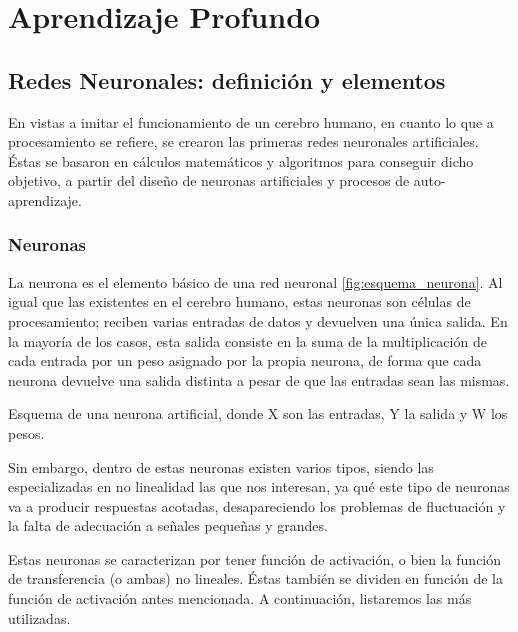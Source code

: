 \chapter{Aprendizaje Profundo}
\label{cap:deepLearning}


\section{Redes Neuronales: definición y elementos}
En vistas a imitar el funcionamiento de un cerebro humano, en cuanto lo que a procesamiento se refiere, se crearon las primeras redes neuronales artificiales. Éstas se basaron en cálculos matemáticos y algoritmos para conseguir dicho objetivo, a partir del diseño de neuronas artificiales y procesos de auto-aprendizaje.

\subsection{Neuronas}
La neurona es el elemento básico de una red neuronal \ref{fig:esquema_neurona}. Al igual que las existentes en el cerebro humano, estas neuronas son células de procesamiento; reciben varias entradas de datos y devuelven una única salida. En la mayoría de los casos, esta salida consiste en la suma de la multiplicación de cada entrada por un peso asignado por la propia neurona, de forma que cada neurona devuelve una salida distinta a pesar de que las entradas sean las mismas.

%
       {Esquema de una neurona artificial, donde X son las entradas, Y la salida y W los pesos.}

Sin embargo, dentro de estas neuronas existen varios tipos, siendo las especializadas en no linealidad las que nos interesan, ya qué este tipo de neuronas va a producir respuestas acotadas, desapareciendo los problemas de fluctuación y la falta de adecuación a señales pequeñas y grandes. 

Estas neuronas se caracterizan por tener función de activación, o bien la función de transferencia (o ambas) no lineales. Éstas también se dividen en función de la función de activación antes mencionada. A continuación, listaremos las más utilizadas.

